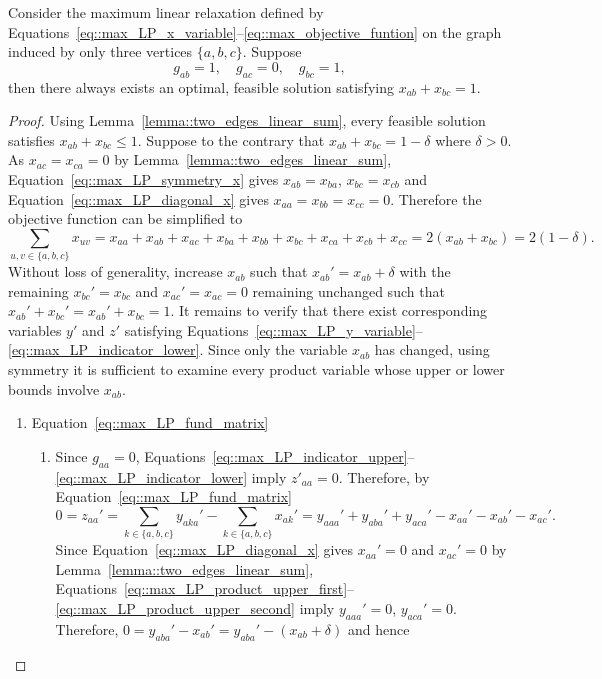 \begin{proposition} \label{prop::local_two_edges_augmentation}
  Consider the maximum linear relaxation defined by Equations~\eqref{eq::max_LP_x_variable}--\eqref{eq::max_objective_funtion} on the graph induced by only three vertices $\{a,b,c\}$. Suppose
  \[
  g_{ab}=1,\quad g_{ac}=0, \quad g_{bc}=1,
  \]
  then there always exists an optimal, feasible solution satisfying $x_{ab}+x_{bc}=1$.
\end{proposition}
\begin{proof}
  Using Lemma~\ref{lemma::two_edges_linear_sum}, every feasible solution satisfies $x_{ab}+x_{bc} \leq 1$. Suppose to the contrary that $x_{ab}+x_{bc} = 1 - \delta$ where $ \delta > 0$. As $x_{ac}=x_{ca}=0$ by Lemma~\ref{lemma::two_edges_linear_sum}, Equation~\eqref{eq::max_LP_symmetry_x} gives $x_{ab}=x_{ba}$, 
  $x_{bc}=x_{cb}$ and Equation~\eqref{eq::max_LP_diagonal_x} gives $x_{aa}=x_{bb}=x_{cc}=0$. Therefore the objective function can be simplified to 
  \[
  \sum_{u,v \in \{a,b,c\}}x_{uv} = x_{aa}+x_{ab}+x_{ac}+x_{ba}+x_{bb}+x_{bc}+x_{ca}+x_{cb}+x_{cc} = 2(x_{ab}+x_{bc}) = 2(1 - \delta). 
  \]
  Without loss of generality, increase $x_{ab}$ such that $x_{ab}'=x_{ab}+\delta$ with the remaining $x_{bc}'=x_{bc}$ and $x_{ac}' = x_{ac} = 0$ remaining unchanged such that $x_{ab}'+x_{bc}'=x_{ab}'+x_{bc}=1$. It remains to verify that there exist corresponding variables $y'$ and $z'$ satisfying Equations~\eqref{eq::max_LP_y_variable}--\eqref{eq::max_LP_indicator_lower}. Since only the variable $x_{ab}$ has changed, using symmetry it is sufficient to examine every product variable whose upper or lower bounds involve $x_{ab}$. 
  \begin{enumerate}[label=\Alph*.]
    \item Equation~\eqref{eq::max_LP_fund_matrix}
      \begin{enumerate}[label=(\roman*)]
        \item Since $g_{aa} = 0$, Equations~\eqref{eq::max_LP_indicator_upper}--\eqref{eq::max_LP_indicator_lower} imply $z'_{aa} = 0$. Therefore, by     Equation~\eqref{eq::max_LP_fund_matrix}
          \[
          0 = z_{aa}' = \sum_{k\in\{a,b,c\}}y_{aka}' -\sum_{k\in\{a,b,c\}}x_{ak}' = y_{aaa}'+y_{aba}'+y_{aca}' -x_{aa}'-x_{ab}'-x_{ac}'.
          \]
          Since Equation~\eqref{eq::max_LP_diagonal_x} gives $x_{aa}'=0$ and $x_{ac}'=0$ by Lemma~\ref{lemma::two_edges_linear_sum}, Equations~\eqref{eq::max_LP_product_upper_first}--\eqref{eq::max_LP_product_upper_second} imply $y_{aaa}'=0$, $y_{aca}'=0$. Therefore, $0 = y_{aba}'-x_{ab}' = y_{aba}'-(x_{ab}+\delta)$ and hence 

\end{enumerate}
\end{enumerate}
\end{proof}
